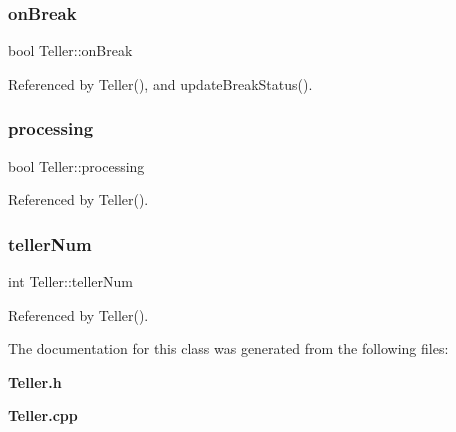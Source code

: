 \mbox{\label{classTeller_a5d1b1edd74ced9664cbf19dd40256a5a}} 
\subsubsection{on\+Break}
{\footnotesize\ttfamily bool Teller\+::on\+Break}



Referenced by Teller(), and update\+Break\+Status().

\mbox{\label{classTeller_aa32cd13ff1cbd061a9765fac2f4b5450}} 
\subsubsection{processing}
{\footnotesize\ttfamily bool Teller\+::processing}



Referenced by Teller().

\mbox{\label{classTeller_a41aed4c5f9440b1dcfa07420a6908f68}} 
\subsubsection{teller\+Num}
{\footnotesize\ttfamily int Teller\+::teller\+Num}



Referenced by Teller().



The documentation for this class was generated from the following files\+:\begin{DoxyCompactItemize}
\item 
\textbf{ Teller.\+h}\item 
\textbf{ Teller.\+cpp}\end{DoxyCompactItemize}
